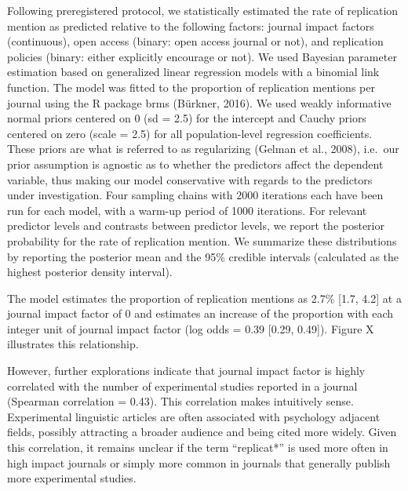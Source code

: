 \documentclass[]{elsarticle} %
\begin{document}
Following preregistered protocol, we statistically estimated the rate of
replication mention as predicted relative to the following factors:
journal impact factors (continuous), open access (binary: open access
journal or not), and replication policies (binary: either explicitly
encourage or not). We used Bayesian parameter estimation based on
generalized linear regression models with a binomial link function. The
model was fitted to the proportion of replication mentions per journal
using the R package brms (Bürkner, 2016). We used weakly informative
normal priors centered on 0 (sd = 2.5) for the intercept and Cauchy
priors centered on zero (scale = 2.5) for all population-level
regression coefficients. These priors are what is referred to as
regularizing (Gelman et al., 2008), i.e.~our prior assumption is
agnostic as to whether the predictors affect the dependent variable,
thus making our model conservative with regards to the predictors under
investigation. Four sampling chains with 2000 iterations each have been
run for each model, with a warm-up period of 1000 iterations. For
relevant predictor levels and contrasts between predictor levels, we
report the posterior probability for the rate of replication mention. We
summarize these distributions by reporting the posterior mean and the
95\% credible intervals (calculated as the highest posterior density
interval).

The model estimates the proportion of replication mentions as 2.7\%
{[}1.7, 4.2{]} at a journal impact factor of 0 and estimates an increase
of the proportion with each integer unit of journal impact factor (log
odds = 0.39 {[}0.29, 0.49{]}). Figure X illustrates this relationship.

However, further explorations indicate that journal impact factor is
highly correlated with the number of experimental studies reported in a
journal (Spearman correlation = 0.43). This correlation makes
intuitively sense. Experimental linguistic articles are often associated
with psychology adjacent fields, possibly attracting a broader audience
and being cited more widely. Given this correlation, it remains unclear
if the term ``replicat*'' is used more often in high impact journals or
simply more common in journals that generally publish more experimental
studies.
\end{document}
